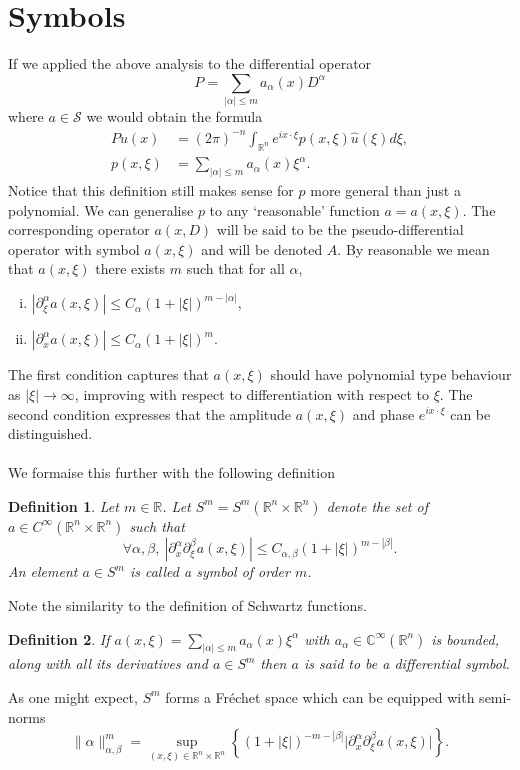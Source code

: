 \documentclass[10pt]{article}
\newcommand{\R}{\mathbb{R}}
\newcommand{\C}{\mathbb{C}}
\newtheorem{defn}{Definition}
\begin{document}
\section{Symbols}
If we applied the above analysis to the differential operator
\[
P = \sum_{|\alpha| \le m} a_\alpha(x) D^{\alpha}
\]
where $a \in \mathcal{S}$ we would obtain the formula
\begin{align*}
Pu(x) & = (2 \pi)^{-n} \int_{\R^n} e^{ix \cdot \xi} p(x,\xi) \hat{u}(\xi) d\xi, \\
p(x,\xi) & = \sum_{|\alpha| \le m} a_\alpha(x) \xi^\alpha.
\end{align*}
Notice that this definition still makes sense for $p$ more general than just a polynomial.
We can generalise $p$ to any `reasonable' function $a = a(x,\xi)$.
The corresponding operator $a(x,D)$ will be said to be the pseudo-differential operator with symbol $a(x,\xi)$ and will be denoted $A$.
By reasonable we mean that $a(x,\xi)$ there exists $m$ such that for all $\alpha$,
\begin{enumerate}[(i)]
\item
$\displaystyle |\partial_\xi^\alpha a(x,\xi)| \le C_\alpha (1 + |\xi|)^{m-|\alpha|}$,
\item
$\displaystyle |\partial_x^\alpha a(x,\xi)| \le C_\alpha (1 + |\xi|)^m$.
\end{enumerate}
The first condition captures that $a(x,\xi)$ should have polynomial type behaviour as $|\xi| \to \infty$, improving with respect to differentiation with respect to $\xi$.
The second condition expresses that the amplitude $a(x,\xi)$ and phase $e^{i x \cdot \xi}$ can be distinguished.
\paragraph{}
We formaise this further with the following definition
\begin{defn}
Let $m \in \R$. Let $S^m = S^m(\R^n \times \R^n)$ denote the set of $a \in C^\infty(\R^n \times \R^n)$ such that
\[
\forall \alpha, \beta, \ |\partial_x^\alpha \partial_\xi^\beta a(x,\xi)| \le C_{\alpha,\beta} (1 + |\xi|)^{m-|\beta|}.
\]
An element $a \in S^m$ is called a symbol of order $m$.
\end{defn}
Note the similarity to the definition of Schwartz functions.
\begin{defn}
If $a(x,\xi) = \sum_{|\alpha| \le m} a_\alpha(x) \xi^\alpha$ with $a_\alpha \in \C^\infty(\R^n)$ is bounded, along with all its derivatives
and $a \in S^m$ then $a$ is said to be a differential symbol.
\end{defn}
As one might expect, $S^m$ forms a Fr\'echet space which can be equipped with semi-norms
\[
\lVert \alpha \rVert_{\alpha, \beta}^m = \sup_{(x,\xi) \in \R^n \times \R^n} \left\{(1 + |\xi|)^{-m - |\beta|} \big| \partial_x^\alpha \partial_\xi^\beta a(x,\xi)\big| \right\}.
\]
\end{document}
